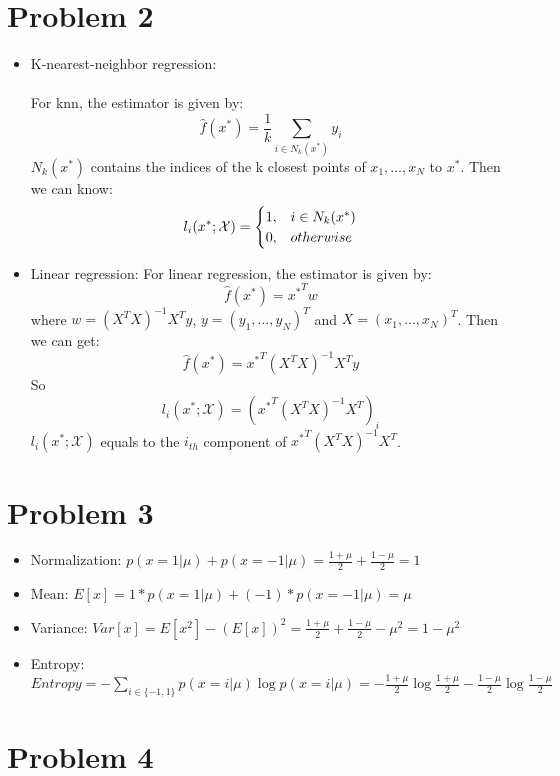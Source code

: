 \documentclass[twoside]{article}
\begin{document}
\section{Problem 2}
\begin{itemize}
\item K-nearest-neighbor regression:
\paragraph{} For knn, the estimator is given by:
$$\hat f(x^*)= \frac{1}{k}\sum_{i\in N_k(x^*)}y_i$$
$N_k(x^*)$ contains the indices of the k closest points of $x_1,\dots,x_N$ to $x^*$.
Then we can know:
\begin{eqnarray}
l_i(x^*; \mathcal{X})=
\begin{cases}
1, & i\in N_k(x^*)\cr
 0, & otherwise 
 \end{cases}
\end{eqnarray}

\item Linear regression:
For linear regression, the estimator is given by:
$$\hat f(x^*) = {x^*}^Tw$$
where $w = (X^TX)^{-1}X^Ty$, $y=(y_1, \dots, y_N)^T$ and $X=(x_1,\dots, x_N)^T$. Then we can get:
$$\hat f(x^*) = {x^*}^T(X^TX)^{-1}X^Ty$$
So $$l_i(x^*; \mathcal{X}) =  ({x^*}^T(X^TX)^{-1}X^T)_i$$
$l_i(x^*; \mathcal{X})$ equals to the $i_{th}$ component of ${x^*}^T(X^TX)^{-1}X^T$.

\end{itemize}


\section{Problem 3}
\begin{itemize}
\item Normalization: $p(x=1|\mu)+p(x=-1|\mu) = \frac{1+\mu}{2}+\frac{1-\mu}{2}=1$
\item Mean:  $E[x]=1*p(x=1|\mu) + (-1)*p(x=-1|\mu)=\mu$
\item Variance: $Var[x]=E[x^2]-(E[x])^2 = \frac{1+\mu}{2}+\frac{1-\mu}{2} - \mu^2 = 1-\mu^2$
\item Entropy: $Entropy = -\sum_{i\in \{-1, 1\}} p(x=i|\mu) \log p(x=i|\mu) = - \frac{1+\mu}{2}\log \frac{1+\mu}{2}- \frac{1-\mu}{2}\log \frac{1-\mu}{2}$
\end{itemize}

\section{Problem 4}
\end{document}
